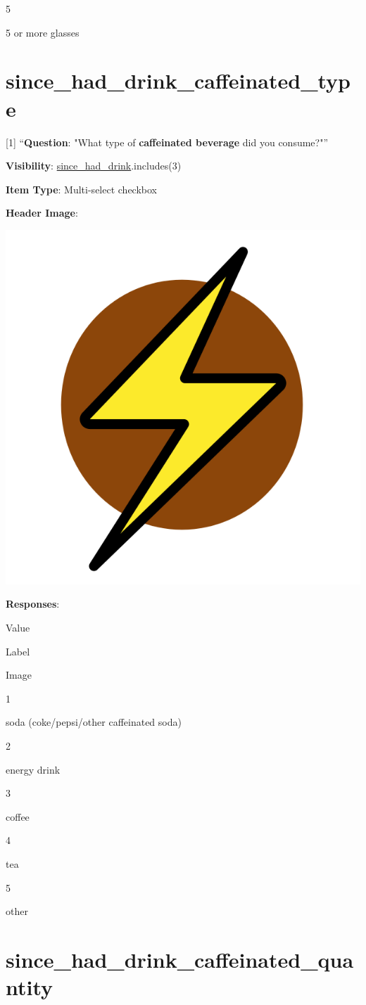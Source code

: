 \documentclass[]{book}
\begin{document}
5

5 or more glasses

\hypertarget{since_had_drink_caffeinated_type}{%
\section{since\_had\_drink\_caffeinated\_type}\label{since_had_drink_caffeinated_type}}

{[}1{]} ``\textbf{Question}: "What type of \textbf{caffeinated beverage} did you consume?"''

\textbf{Visibility}: \protect\hyperlink{since_had_drink}{since\_had\_drink}.includes(3)

\textbf{Item Type}: Multi-select checkbox

\textbf{Header Image}:

\begin{flushleft}\includegraphics[width=0.33\linewidth]{downloadFigs4latex_NIMH_Applet_Codebook/since_had_drink_caffeinated_type_headerImg} \end{flushleft}

\textbf{Responses}:

Value

Label

Image

1

soda (coke/pepsi/other caffeinated soda)

2

energy drink

3

coffee

4

tea

5

other

\hypertarget{since_had_drink_caffeinated_quantity}{%
\section{since\_had\_drink\_caffeinated\_quantity}\label{since_had_drink_caffeinated_quantity}}
\end{document}
